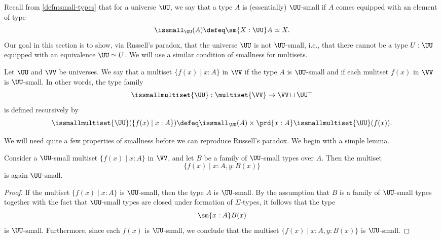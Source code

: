 Recall from \cref{defn:small-types} that for a universe $\UU$, we say that a type $A$ is (essentially) $\UU$-small if $A$ comes equipped with an element of type
\begin{equation*}
  \issmall_{\UU}(A)\defeq \sm{X:\UU}A\simeq X. 
\end{equation*}
Our goal in this section is to show, via Russell's paradox, that the universe $\UU$ is not $\UU$-small, i.e., that there cannot be a type $U:\UU$ equipped with an equivalence $\UU\simeq U$. We will use a similar condition of smallness for multisets.

\begin{defn}
  Let $\UU$ and $\VV$ be universes. We say that a multiset $\{f(x)\mid x:A\}$ in $\VV$  if the type $A$ is $\UU$-small and if each mulitset $f(x)$ in $\VV$ is $\UU$-small. In other words, the type family
  \begin{equation*}
    \issmallmultiset{\UU} : \multiset{\VV}\to \VV\sqcup\UU^+ 
  \end{equation*}
  is defined recursively by
  \begin{equation*}
    \issmallmultiset{\UU}(\{f(x)\mid x:A\}) \defeq \issmall_{\UU}(A)\times \prd{x:A}\issmallmultiset{\UU}(f(x)).
  \end{equation*}
\end{defn}

We will need quite a few properties of smallness before we can reproduce Russell's paradox. We begin with a simple lemma.

\begin{lem}\label{lem:is-small-comprehension-multiset}
  Consider a $\UU$-small multiset $\{f(x)\mid x:A\}$ in $\VV$, and let $B$ be a family of $\UU$-small types over $A$. Then the multiset
  \begin{equation*}
    \{f(x)\mid x:A, y:B(x)\}
  \end{equation*}
  is again $\UU$-small.
\end{lem}

\begin{proof}
  If the multiset $\{f(x)\mid x:A\}$ is $\UU$-small, then the type $A$ is $\UU$-small. By the assumption that $B$ is a family of $\UU$-small types together with the fact that $\UU$-small types are closed under formation of $\Sigma$-types, it follows that the type
  \begin{equation*}
    \sm{x:A}B(x)
  \end{equation*}
  is $\UU$-small. Furthermore, since each $f(x)$ is $\UU$-small, we conclude that the multiset $\{f(x)\mid x:A,y:B(x)\}$ is $\UU$-small. 
\end{proof}

